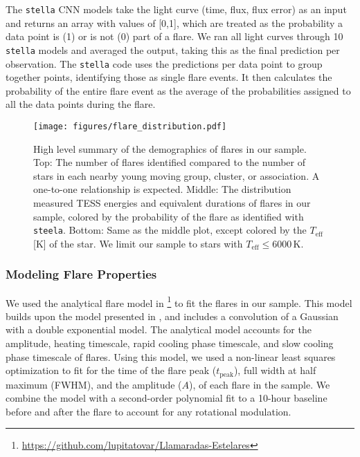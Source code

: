 \documentclass[twocolumn]{aastex631}
\begin{document}
The \texttt{stella} CNN models take the light curve (time, flux, flux error)
as an input and returns an array with values of [0,1], which are treated as
the probability a data point is (1) or is not (0) part of a flare. We ran all
light curves through 10 \texttt{stella} models and averaged the output, taking
this as the final prediction per observation. The \texttt{stella} code uses the
predictions per data point to group together points, identifying those as single
flare events. It then calculates the probability of the entire flare event as
the average of the probabilities assigned to all the data points during the flare.


\begin{figure}[ht!]
    \begin{centering}
        \texttt{[image: figures/flare\_distribution.pdf]}
        \caption{
            High level summary of the demographics of flares in our sample. Top:
            The number of flares identified compared to the number of stars in
            each nearby young moving group, cluster, or association. A one-to-one
            relationship is expected. Middle: The distribution measured TESS energies
            and equivalent durations of flares in our sample, colored by the probability
            of the flare as identified with \texttt{steela}. Bottom: Same as the
            middle plot, except colored by the $T_\textrm{eff}$ [K] of the star.
            We limit our sample to stars with $T_\textrm{eff} \leq 6000$\,K.
        }
        \label{fig:flare_distribution}
    \end{centering}
\end{figure}


\subsubsection{Modeling Flare Properties}

We used the analytical flare model in
\cite{tovar22}\footnote{\url{https://github.com/lupitatovar/Llamaradas-Estelares}}
to fit the flares in our sample. This model builds upon the model presented
in \cite{davenport14}, and includes a convolution of a Gaussian with a
double exponential model. The analytical model accounts for the amplitude,
heating timescale, rapid cooling phase timescale, and slow cooling phase
timescale of flares. Using this model, we used a non-linear least squares
optimization to fit for the time of the flare peak ($t_\textrm{peak}$),
full width at half maximum (FWHM), and the amplitude ($A$), of each flare
in the sample. We combine the model with a second-order polynomial fit to
a 10-hour baseline before and after the flare to account for any rotational
modulation.
\end{document}
